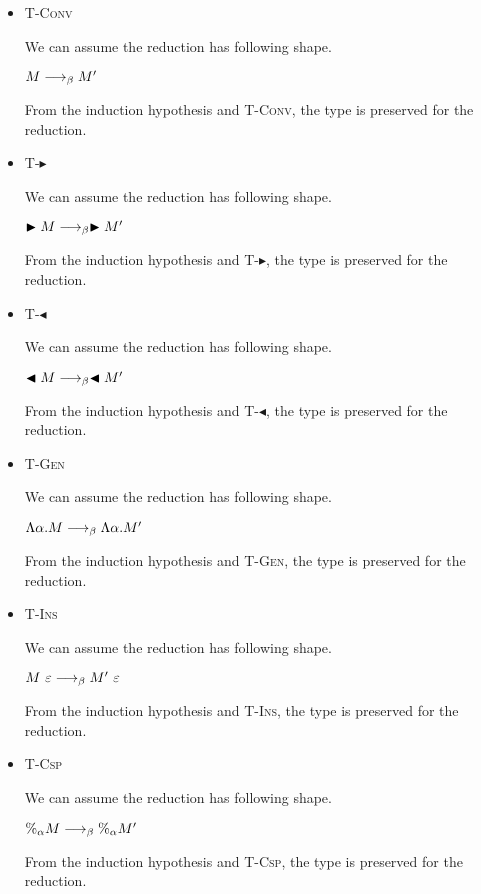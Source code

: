 \documentclass[9pt, a4paper]{extarticle}
\theoremstyle{break}
\newcommand{\TB}{\blacktriangleright}
\newcommand{\TBL}{\blacktriangleleft}
\newcommand{\TAbs}{\textsc{T-Abs}}
\newcommand{\TConv}{\textsc{T-Conv}}
\newcommand{\TTB}{\textsc{T-$\TB$}}
\newcommand{\TTBL}{\textsc{T-$\TBL$}}
\newcommand{\TGen}{\textsc{T-Gen}}
\newcommand{\TIns}{\textsc{T-Ins}}
\newcommand{\TCsp}{\textsc{T-Csp}}
\begin{document}
\begin{itemize}
	      From the induction hypothesis and \TAbs, the type is preserved for the reduction.


	\item \TConv

	      We can assume the reduction has following shape.

	      $M \longrightarrow_{\beta} M'$

	      From the induction hypothesis and \TConv, the type is preserved for the reduction.

	\item \TTB

	      We can assume the reduction has following shape.

	      $\TB M \LB \TB M'$

	      From the induction hypothesis and \TTB, the type is preserved for the reduction.

	\item \TTBL

	      We can assume the reduction has following shape.

	      $\TBL M \LB \TBL M'$

	      From the induction hypothesis and \TTBL, the type is preserved for the reduction.

	\item \TGen

	      We can assume the reduction has following shape.

	      $\Lambda\alpha. M \longrightarrow_{\beta} \Lambda\alpha. M'$

	      From the induction hypothesis and \TGen, the type is preserved for the reduction.

	\item \TIns

	      We can assume the reduction has following shape.

	      $M\ \varepsilon \longrightarrow_{\beta} M'\ \varepsilon$

	      From the induction hypothesis and \TIns, the type is preserved for the reduction.

	\item \TCsp

	      We can assume the reduction has following shape.

	      $\%_\alpha M \longrightarrow_{\beta} \%_\alpha M'$

	      From the induction hypothesis and \TCsp, the type is preserved for the reduction.

	      \fi

\end{itemize}
\end{document}
